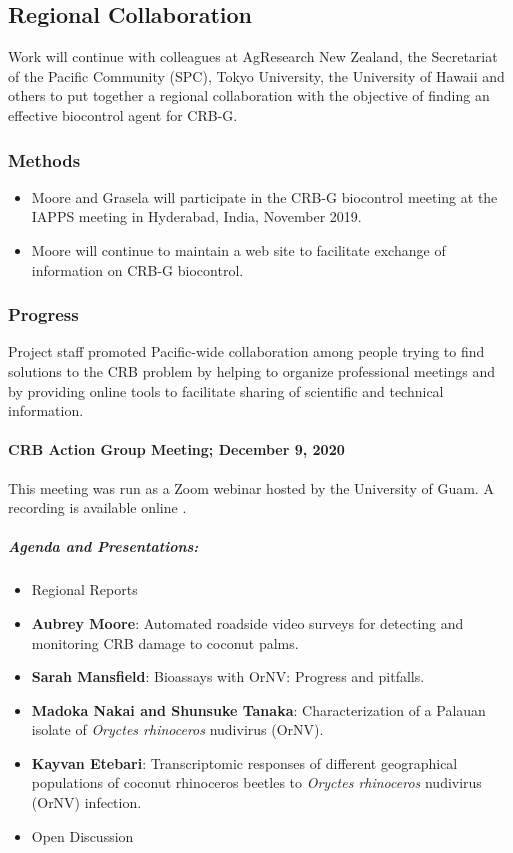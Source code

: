 \documentclass[12pt,letterpaper,english,bibliography=totocnumbered,abstract=on]{scrartcl}
\begin{document}
\newpage
\begin{framed}
\subsection{Regional Collaboration}

Work will continue with colleagues at AgResearch New Zealand, the Secretariat of the Pacific Community (SPC), Tokyo University, the University of Hawaii and others to put together a regional collaboration with the objective of finding an effective biocontrol agent for CRB-G.

\subsubsection{Methods}

\begin{itemize}
    \item Moore and Grasela will participate in the CRB-G biocontrol meeting at the IAPPS meeting in Hyderabad, India, November 2019.
    \item Moore will continue to maintain a web site to facilitate exchange of information on CRB-G biocontrol.
\end{itemize}
\end{framed}

\subsubsection{Progress}

Project staff promoted Pacific-wide collaboration among people trying to find solutions to the CRB problem by helping to organize professional meetings and by providing online tools to facilitate sharing of scientific and technical information.

\paragraph{CRB Action Group Meeting; December 9, 2020}
This meeting was run as a Zoom webinar hosted by the University of Guam. A recording is available online \cite{mooreVideoRecordingCRBG2020}.

\subparagraph{Agenda and Presentations:}

\begin{itemize}
	\item Regional Reports
	\item \textbf{Aubrey Moore}: Automated roadside video surveys for detecting and monitoring CRB damage to coconut palms. \cite{mooreAutomatedRoadsideVideo2020}
	\item \textbf{Sarah Mansfield}: Bioassays with OrNV: Progress and pitfalls.
	\item \textbf{Madoka Nakai and Shunsuke Tanaka}: Characterization of a Palauan isolate of \textit{Oryctes rhinoceros} nudivirus (OrNV).
	\item \textbf{Kayvan Etebari}: Transcriptomic responses of different geographical populations of coconut rhinoceros beetles to \textit{Oryctes rhinoceros} nudivirus (OrNV) infection.
	\item Open Discussion	
\end{itemize}
\end{document}
